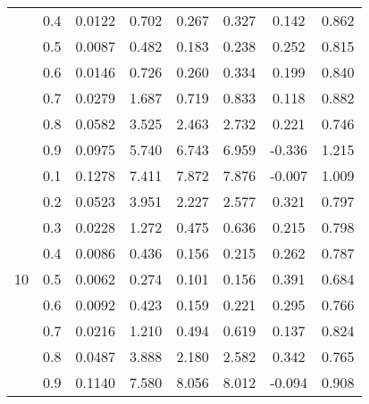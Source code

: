 \documentclass[11pt,a4paper]{report}
\begin{document}
\begin{longtable}{ | c | c || c | c | c | c | c | c | }
 & 0.4 & 0.0122 & 0.702 & 0.267 & 0.327 & 0.142 & 0.862 \\
 & 0.5 & 0.0087 & 0.482 & 0.183 & 0.238 & 0.252 & 0.815 \\
 & 0.6 & 0.0146 & 0.726 & 0.260 & 0.334 & 0.199 & 0.840 \\
 & 0.7 & 0.0279 & 1.687 & 0.719 & 0.833 & 0.118 & 0.882 \\
 & 0.8 & 0.0582 & 3.525 & 2.463 & 2.732 & 0.221 & 0.746 \\
 & 0.9 & 0.0975 & 5.740 & 6.743 & 6.959 & -0.336 & 1.215 \\
 \hline
\multirow{9}{*}{10} & 0.1 & 0.1278 & 7.411 & 7.872 & 7.876 & -0.007 & 1.009 \\
 & 0.2 & 0.0523 & 3.951 & 2.227 & 2.577 & 0.321 & 0.797 \\
 & 0.3 & 0.0228 & 1.272 & 0.475 & 0.636 & 0.215 & 0.798 \\
 & 0.4 & 0.0086 & 0.436 & 0.156 & 0.215 & 0.262 & 0.787 \\
 & 0.5 & 0.0062 & 0.274 & 0.101 & 0.156 & 0.391 & 0.684 \\
 & 0.6 & 0.0092 & 0.423 & 0.159 & 0.221 & 0.295 & 0.766 \\
 & 0.7 & 0.0216 & 1.210 & 0.494 & 0.619 & 0.137 & 0.824 \\
 & 0.8 & 0.0487 & 3.888 & 2.180 & 2.582 & 0.342 & 0.765 \\
 & 0.9 & 0.1140 & 7.580 & 8.056 & 8.012 & -0.094 & 0.908 \\
 \hline
\hline
\end{longtable}
\end{document}
